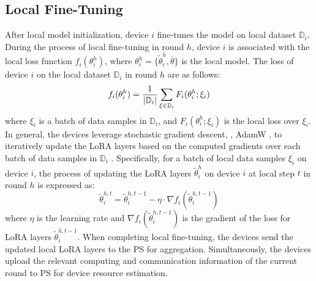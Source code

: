 \subsection{Local Fine-Tuning} 
\vspace{-0.1cm}
After local model initialization, device $i$ fine-tunes the model on local dataset $\mathbb{D}_i$.
During the process of local fine-tuning in round $h$, device $i$ is associated with the local loss function $f_i(\theta_i^h)$, where $\theta_i^h = \{ \widetilde{\theta}_i^h, \overline{\theta} \}$ is the local model.
The loss of device $i$ on the local dataset $\mathbb{D}_i$ in round $h$ are as follows:
\vspace{-0.3cm}
\begin{equation}
    f_i(\theta_i^h) = \frac{1}{|\mathbb{D}_i|} \sum_{\xi \in \mathbb{D}_i} F_i(\theta_i^h; \xi_i)
    \vspace{-0.3cm}
\end{equation}
where $\xi_i$ is a batch of data samples in $\mathbb{D}_i$, and $F_i(\theta_i^h; \xi_i)$ is the local loss over $\xi_i$. 
In general, the devices leverage stochastic gradient descent, \eg, AdamW \cite{loshchilov2017decoupled}, to iteratively update the LoRA layers based on the computed gradients over each batch of data samples in $\mathbb{D}_i$ \cite{lin2021fednlp, cai2022fedadapter}.
Specifically, for a batch of local data samples $\xi_i$ on device $i$, the process of updating the LoRA layers $\widetilde{\theta}_i^{h}$ on device $i$ at local step $t$ in round $h$ is expressed as: 
\vspace{-0.2cm}
\begin{equation}
    \widetilde{\theta}_i^{h,t} = \widetilde{\theta}_i^{h,t - 1} - \eta \cdot \nabla f_i(\widetilde{\theta}_i^{h, t - 1})
\end{equation}
where $\eta$ is the learning rate and $\nabla f_i(\widetilde{\theta}_i^{h, t - 1})$ is the gradient of the loss for LoRA layers $\widetilde{\theta}_i^{h, t - 1}$.
When completing local fine-tuning, the devices send the updated local LoRA layers to the PS for aggregation.
Simultaneously, the devices upload the relevant computing and communication information of the current round to PS for device resource estimation.
\vspace{-0.2cm}

